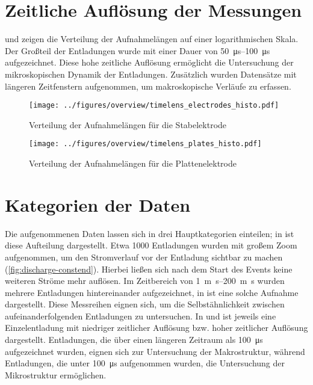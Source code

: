 \section{Zeitliche Auflösung der Messungen}
 und  zeigen die Verteilung der Aufnahmelängen auf einer logarithmischen Skala. Der Großteil der Entladungen wurde mit einer Dauer von \SIrange{50}{100}{\micro\second} aufgezeichnet. Diese hohe zeitliche Auflösung ermöglicht die Untersuchung der mikroskopischen Dynamik der Entladungen. Zusätzlich wurden Datensätze mit längeren Zeitfenstern aufgenommen, um makroskopische Verläufe zu erfassen.


\begin{figure}[htbp]
    \centering
    \begin{minipage}[t]{0.47\textwidth}
        \centering
        \texttt{[image: ../figures/overview/timelens\_electrodes\_histo.pdf]}
        \caption{Verteilung der Aufnahmelängen für die Stabelektrode}
        \label{fig:histogram-timelen-stab}
    \end{minipage}
    \hfill
    \begin{minipage}[t]{0.47\textwidth}
        \centering
        \texttt{[image: ../figures/overview/timelens\_plates\_histo.pdf]}
        \caption{Verteilung der Aufnahmelängen für die Plattenelektrode}
        \label{fig:histogram-timelen-platte}
    \end{minipage}
\end{figure}

\section{Kategorien der Daten}

Die aufgenommenen Daten lassen sich in drei Hauptkategorien einteilen; in  ist diese Aufteilung dargestellt. Etwa 1000 Entladungen wurden mit großem Zoom aufgenommen, um den Stromverlauf vor der Entladung sichtbar zu machen (\ref{fig:discharge-constend}). Hierbei ließen sich nach dem Start des Events keine weiteren Ströme mehr auflösen. 
Im Zeitbereich von \SIrange{1}{200}{\m\second} wurden mehrere Entladungen hintereinander aufgezeichnet, in  ist eine solche Aufnahme dargestellt. Diese Messreihen eignen sich, um die Selbstähnlichkeit zwischen aufeinanderfolgenden Entladungen zu untersuchen. In  und  ist jeweils eine Einzelentladung mit niedriger zeitlicher Auflösung bzw. hoher zeitlicher Auflösung dargestellt. Entladungen, die über einen längeren Zeitraum als \SI{100}{\micro\second} aufgezeichnet wurden, eignen sich zur Untersuchung der Makrostruktur, während Entladungen, die unter \SI{100}{\micro\second} aufgenommen wurden, die Untersuchung der Mikrostruktur ermöglichen.


